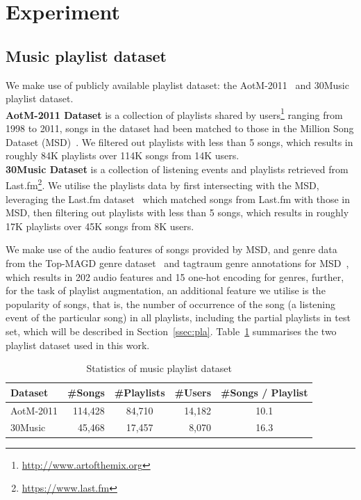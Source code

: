 \section{Experiment}
\label{sec:experiment}

\subsection{Music playlist dataset}
We make use of publicly available playlist dataset: the AotM-2011~\cite{mcfee2012hypergraph} and 30Music~\cite{30music2015} playlist dataset. \\
%
{\bf AotM-2011 Dataset} is a collection of playlists shared by users\footnote{\url{http://www.artofthemix.org}} ranging from 1998 to 2011, 
songs in the dataset had been matched to those in the Million Song Dataset (MSD)~\cite{msd2011}.
We filtered out playlists with less than 5 songs, which results in roughly 84K playlists over 114K songs from 14K users. \\
%
{\bf 30Music Dataset} is a collection of listening events and playlists retrieved from Last.fm\footnote{\url{https://www.last.fm}}.
We utilise the playlists data by first intersecting with the MSD, leveraging the Last.fm dataset~\cite{lastfmdataset} 
which matched songs from Last.fm with those in MSD, then filtering out playlists with less than 5 songs, 
which results in roughly 17K playlists over 45K songs from 8K users.

We make use of the audio features of songs provided by MSD, 
and genre data from the Top-MAGD genre dataset~\cite{schindler2012facilitating} and tagtraum genre annotations for MSD~\cite{schreiber2015improving},
which results in 202 audio features and 15 one-hot encoding for genres,
further, for the task of playlist augmentation, an additional feature we utilise is the popularity of songs,
that is, the number of occurrence of the song (\ie a listening event of the particular song) in all playlists,
including the partial playlists in test set, which will be described in Section~\ref{ssec:pla}.
%
%
Table~\ref{tab:stats_pldata} summarises the two playlist dataset used in this work.
%
\begin{table}[!h]
\centering
\caption{Statistics of music playlist dataset}
\label{tab:stats_pldata}
\small
\begin{tabular}{l|rcrc}
\toprule
Dataset   & \#Songs & \#Playlists & \#Users & \#Songs / Playlist \\
\midrule
AotM-2011 & 114,428 & 84,710      & 14,182  & 10.1 \\
30Music   & 45,468  & 17,457      & 8,070   & 16.3 \\
\bottomrule
\end{tabular}
\end{table}


